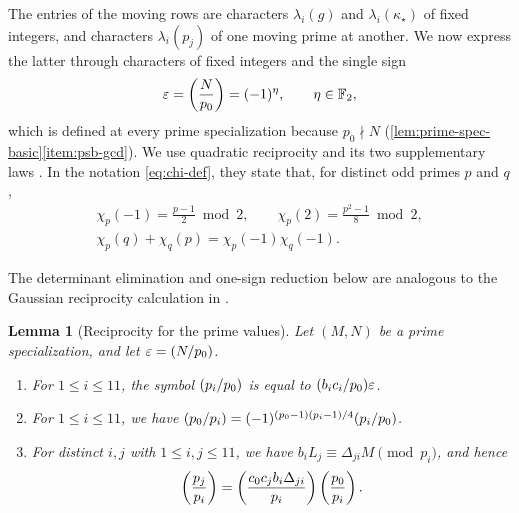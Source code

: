 \documentclass[12pt,oneside,openany]{book}
\theoremstyle{definition}
\theoremstyle{plain}
\numberwithin{equation}{chapter}
\theoremstyle{plain}
\newtheorem{lemma}[lemma]{Lemma}
\theoremstyle{definition}
\theoremstyle{remark}
\newcommand{\F}{\mathbb F}
\newcommand{\leg}[2]{\mathchoice{\left(\frac{#1}{#2}\right)}{(#1/#2)}{(#1/#2)}{(#1/#2)}}
\newcommand{\eps}{\varepsilon}
\begin{document}
The entries of the moving rows are characters $\lambda_i(g)$ and $\lambda_i(\kappa_\star)$ of fixed integers, and characters $\lambda_i(p_j)$ of one moving prime at another. We now express the latter through characters of fixed integers and the single sign
\begin{equation}\label{eq:eps-def}
\eps=\leg N{p_0}=(-1)^\eta,\qquad\eta\in\F_2,
\end{equation}
which is defined at every prime specialization because $p_0\nmid N$ (\cref{lem:prime-spec-basic}\ref{item:psb-gcd}). We use quadratic reciprocity and its two supplementary laws \cite[Chapter~5, Section~2, Theorem~1, p.~53]{IrelandRosen}. In the notation \eqref{eq:chi-def}, they state that, for distinct odd primes $p$ and $q$,
\begin{equation}\label{eq:reciprocity}
\begin{gathered}
\chi_p(-1)=\frac{p-1}2\bmod2,\qquad\chi_p(2)=\frac{p^2-1}8\bmod2,\\
\chi_p(q)+\chi_q(p)=\chi_p(-1)\chi_q(-1).
\end{gathered}
\end{equation}

The determinant elimination and one-sign reduction below are analogous to the Gaussian reciprocity calculation in \cite[Lemma~4.1]{Savoie2026}.

\begin{lemma}[Reciprocity for the prime values]\label{lem:reciprocity}
Let $(M,N)$ be a prime specialization, and let $\eps=\leg N{p_0}$.
\begin{enumerate}[label=(\alph*),ref=(\alph*)]
\item\label{item:rec-pivot} For $1\le i\le11$, the symbol $\leg{p_i}{p_0}$ is equal to $\leg{b_ic_i}{p_0}\eps$.
\item\label{item:rec-reverse} For $1\le i\le11$, we have $\leg{p_0}{p_i}=(-1)^{(p_0-1)(p_i-1)/4}\leg{p_i}{p_0}$.
\item\label{item:rec-cross} For distinct $i,j$ with $1\le i,j\le11$, we have $b_iL_j\equiv\Delta_{ji}M\pmod{p_i}$, and hence
\begin{equation}\label{eq:rec-cross}
\leg{p_j}{p_i}=\leg{c_0c_jb_i\Delta_{ji}}{p_i}\leg{p_0}{p_i}.
\end{equation}
\end{enumerate}
\end{lemma}
\end{document}
